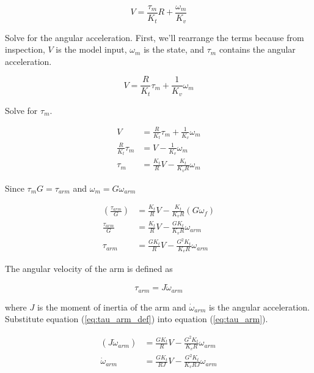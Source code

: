 \begin{equation*}
  V = \frac{\tau_m}{K_t} R + \frac{\omega_m}{K_v}
\end{equation*}

Solve for the angular acceleration. First, we'll rearrange the terms because
from inspection, $V$ is the model input, $\omega_m$ is the state, and $\tau_m$
contains the angular acceleration.

\begin{equation*}
  V = \frac{R}{K_t} \tau_m + \frac{1}{K_v} \omega_m
\end{equation*}

Solve for $\tau_m$.

\begin{align*}
  V &= \frac{R}{K_t} \tau_m + \frac{1}{K_v} \omega_m \\
  \frac{R}{K_t} \tau_m &= V - \frac{1}{K_v} \omega_m \\
  \tau_m &= \frac{K_t}{R} V - \frac{K_t}{K_v R} \omega_m
\end{align*}

Since $\tau_m G = \tau_{arm}$ and $\omega_m = G \omega_{arm}$

\begin{align}
  \left(\frac{\tau_{arm}}{G}\right) &= \frac{K_t}{R} V -
    \frac{K_t}{K_v R} (G \omega_f) \nonumber \\
  \frac{\tau_{arm}}{G} &= \frac{K_t}{R} V - \frac{G K_t}{K_v R} \omega_{arm}
    \nonumber \\
  \tau_{arm} &= \frac{G K_t}{R} V - \frac{G^2 K_t}{K_v R} \omega_{arm}
    \label{eq:tau_arm}
\end{align}

The angular velocity of the arm is defined as

\begin{equation}
  \tau_{arm} = J \dot{\omega}_{arm} \label{eq:tau_arm_def}
\end{equation}

where $J$ is the moment of inertia of the arm and $\dot{\omega}_{arm}$ is the
angular acceleration. Substitute equation (\ref{eq:tau_arm_def}) into equation
(\ref{eq:tau_arm}).

\begin{align}
  (J \dot{\omega}_{arm}) &= \frac{G K_t}{R} V - \frac{G^2 K_t}{K_v R}
    \omega_{arm} \nonumber \\
  \dot{\omega}_{arm} &= \frac{G K_t}{RJ} V - \frac{G^2 K_t}{K_v RJ} \omega_{arm}
    \label{eq:dot_omega_arm}
\end{align}

